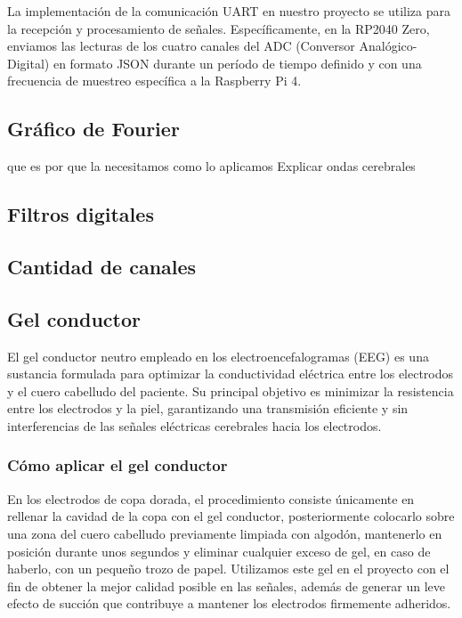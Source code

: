 \documentclass{article}
\begin{document}
La implementación de la comunicación UART en nuestro proyecto se utiliza para la recepción y procesamiento de señales. Específicamente, en la RP2040 Zero, enviamos las lecturas de los cuatro canales del ADC (Conversor Analógico-Digital) en formato JSON durante un período de tiempo definido y con una frecuencia de muestreo específica a la Raspberry Pi 4.

\subsection{Gráfico de Fourier}
que es
por que la necesitamos
como lo aplicamos
Explicar ondas cerebrales

\subsection{Filtros digitales}

\subsection{Cantidad de canales}

\subsection{Gel conductor}
El gel conductor neutro empleado en los electroencefalogramas (EEG) es una sustancia formulada para optimizar la conductividad eléctrica entre los electrodos y el cuero cabelludo del paciente. Su principal objetivo es minimizar la resistencia entre los electrodos y la piel, garantizando una transmisión eficiente y sin interferencias de las señales eléctricas cerebrales hacia los electrodos. 

\subsubsection{Cómo aplicar el gel conductor}
En los electrodos de copa dorada, el procedimiento consiste únicamente en rellenar la cavidad de la copa con el gel conductor, posteriormente colocarlo sobre una zona del cuero cabelludo previamente limpiada con algodón, mantenerlo en posición durante unos segundos y eliminar cualquier exceso de gel, en caso de haberlo, con un pequeño trozo de papel. Utilizamos este gel en el proyecto con el fin de obtener la mejor calidad posible en las señales, además de generar un leve efecto de succión que contribuye a mantener los electrodos firmemente adheridos.
\end{document}
